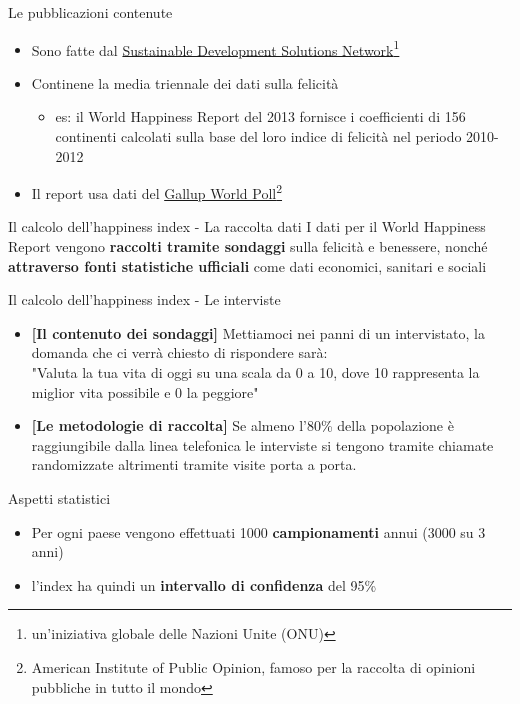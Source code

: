 \documentclass{beamer}
\begin{document}
\begin{frame}{Le pubblicazioni contenute}
	\begin{itemize}
		\item Sono fatte dal \href{https://www.unsdsn.org/}{ Sustainable Development Solutions Network}\footnote{un'iniziativa globale delle Nazioni Unite (ONU)}
		\item Continene la media triennale dei dati sulla felicità
		\begin{itemize}
			\item es: il World Happiness Report del 2013 fornisce i coefficienti di 156 continenti calcolati sulla base del loro indice di felicità nel periodo 2010-2012
		\end{itemize}
	\item Il report usa dati del \href{https://www.gallup.com/topic/world-poll.aspx}{Gallup World Poll}\footnote{American Institute of Public Opinion, famoso per la raccolta di opinioni pubbliche in tutto il mondo}
	\end{itemize}
\end{frame}

\begin{frame}{Il calcolo dell'happiness index - La raccolta dati}
	I dati per il World Happiness Report vengono \textbf{raccolti tramite sondaggi} sulla felicità e benessere, nonché \textbf{attraverso fonti statistiche ufficiali} come dati economici, sanitari e sociali
\end{frame}

\begin{frame}{Il calcolo dell'happiness index - Le interviste}
	\begin{itemize}
		\item \textbf{[Il contenuto dei sondaggi]} Mettiamoci nei panni di un intervistato, la domanda che ci verrà chiesto di rispondere sarà: \\
		"Valuta la tua vita di oggi su una scala da 0 a 10, dove 10 rappresenta la miglior vita possibile e 0 la peggiore"
		\item \textbf{[Le metodologie di raccolta]} Se almeno l'80\% della popolazione è raggiungibile dalla linea telefonica le interviste si tengono tramite chiamate randomizzate altrimenti tramite visite porta a porta.
	\end{itemize}
\end{frame}

\begin{frame}{Aspetti statistici}
	\begin{itemize}
		\item Per ogni paese vengono effettuati 1000 \textbf{campionamenti} annui (3000 su 3 anni)
		\item l'index ha quindi un \textbf{intervallo di confidenza} del 95\%
	\end{itemize}
\end{frame}
\end{document}
